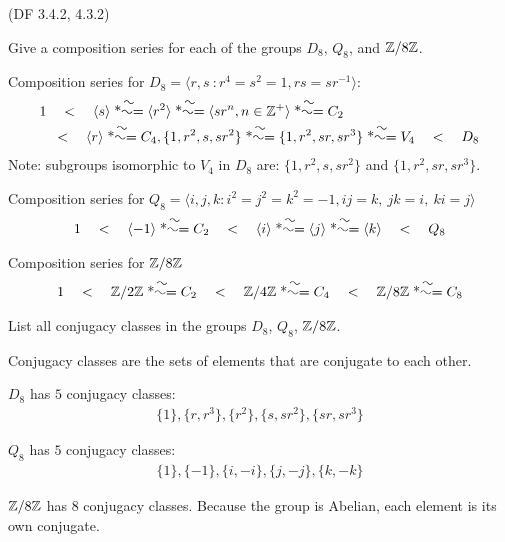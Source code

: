 \begin{problem}{(\textsf{DF 3.4.2, 4.3.2})}
  \begin{enumalph}
  \item Give a composition series for each of the groups $D_8$, $Q_8$, and $\mathbb{Z}/8\mathbb{Z}$.
  \begin{Answer}
    \begin{enumalph}
      \item Composition series for $D_8 = \langle r, s\ \colon r^{4} = s^{2} = 1, rs = sr^{-1} \rangle$:
        \begin{align*}
          &1 \quad < \quad
          \langle s \rangle
          \isom \langle r^2 \rangle
          \isom \langle sr^n, n \in \Z^+ \rangle
          \isom C_2 \\
          &\quad < \quad
          \langle r \rangle \isom C_4,
          \{1, r^2, s, sr^2\} \isom \{1, r^2, sr, sr^3\} \isom V_4 \quad < \quad
          D_8
        \end{align*}
        Note: subgroups isomorphic to $V_4$ in $D_8$ are:
        $\{1, r^2, s, sr^2\}$ and $\{1, r^2, sr, sr^3\}$.
      \item Composition series for $Q_8 = \langle i, j, k \colon i^2 = j^2 = k^2 = -1,
        ij=k,\ jk=i,\ ki=j \rangle$
        \begin{align*}
          1 \quad < \quad
          \langle -1 \rangle \isom C_2 \quad < \quad
          \langle i \rangle
          \isom \langle j \rangle
          \isom \langle k \rangle \quad < \quad
          Q_8
        \end{align*}
      \item Composition series for $\mathbb{Z}/8\mathbb{Z}$
        \begin{align*}
          1 \quad < \quad
          \Z/2\Z \isom C_2 \quad < \quad
          \Z/4\Z \isom C_4 \quad < \quad
          \Z/8\Z \isom C_8
        \end{align*}
    \end{enumalph}
  \end{Answer}
  \item List all conjugacy classes in the groups $D_8$, $Q_8$, $\mathbb{Z}/8\mathbb{Z}$.
    \begin{Answer}
      Conjugacy classes are the sets of elements that are conjugate to each other.
      \begin{enumalph}
        \item $D_8$ has $5$ conjugacy classes:
          \begin{align*}
            \{1\}, \{r, r^3\}, \{r^2\}, \{s, sr^2\}, \{sr, sr^3\}
          \end{align*}
        \item $Q_8$ has $5$ conjugacy classes:
          \begin{align*}
            \{1\}, \{ -1 \}, \{i, -i\}, \{j, -j\}, \{k, -k\}
          \end{align*}
        \item $\mathbb{Z}/8\mathbb{Z}$ has $8$ conjugacy classes. Because the group is Abelian,
          each element is its own conjugate.
      \end{enumalph}
    \end{Answer}
  \end{enumalph}
\end{problem}
